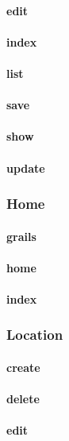 \documentclass[12pt]{article}
\begin{document}
\paragraph{edit}
\paragraph{index}
\paragraph{list}
\paragraph{save}
\paragraph{show}
\paragraph{update}

\subsubsection{Home}\label{sec:CHome}
\paragraph{grails}
\paragraph{home}
\paragraph{index}

\subsubsection{Location}\label{sec:CLocation}
\paragraph{create}
\paragraph{delete}
\paragraph{edit}
\end{document}
